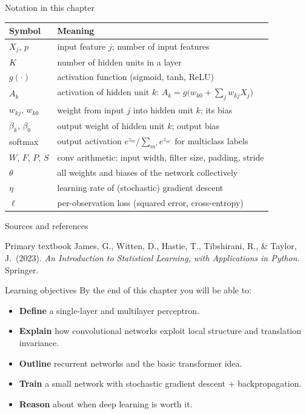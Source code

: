 \documentclass[aspectratio=169,11pt]{beamer}
\begin{document}
\begin{frame}{Notation in this chapter}
  \footnotesize
  \begin{center}
  \begin{tabular}{@{}ll@{}}
    \toprule
    \textbf{Symbol} & \textbf{Meaning} \\
    \midrule
    $X_j$, $p$ & input feature $j$; number of input features \\
    $K$ & number of hidden units in a layer \\
    $g(\cdot)$ & activation function (sigmoid, tanh, ReLU) \\
    $A_k$ & activation of hidden unit $k$: $A_k=g\big(w_{k0}+\sum_j w_{kj}X_j\big)$ \\
    $w_{kj}$, $w_{k0}$ & weight from input $j$ into hidden unit $k$; its bias \\
    $\beta_k$, $\beta_0$ & output weight of hidden unit $k$; output bias \\
    softmax & output activation $e^{z_m}/\sum_{m'} e^{z_{m'}}$ for multiclass labels \\
    $W$, $F$, $P$, $S$ & conv arithmetic: input width, filter size, padding, stride \\
    $\theta$ & all weights and biases of the network collectively \\
    $\eta$ & learning rate of (stochastic) gradient descent \\
    $\ell$ & per-observation loss (squared error, cross-entropy) \\
    \bottomrule
  \end{tabular}
  \end{center}
\end{frame}

\begin{frame}{Sources and references}
  \begin{block}{Primary textbook}
    James, G., Witten, D., Hastie, T., Tibshirani, R., \& Taylor, J.\ (2023).
    \emph{An Introduction to Statistical Learning, with Applications in
    Python.} Springer.
  \end{block}
\end{frame}

\begin{frame}{Learning objectives}
  By the end of this chapter you will be able to:
  \begin{itemize}
    \item \textbf{Define} a single-layer and multilayer perceptron.
    \item \textbf{Explain} how convolutional networks exploit local
          structure and translation invariance.
    \item \textbf{Outline} recurrent networks and the basic
          transformer idea.
    \item \textbf{Train} a small network with stochastic gradient
          descent + backpropagation.
    \item \textbf{Reason} about when deep learning is worth it.
  \end{itemize}
\end{frame}
\end{document}
